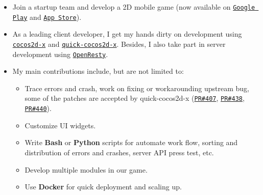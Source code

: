 \documentclass[letterpaper]{article}
\begin{document}
\begin{itemize}
\begin{itemize}
            \item Join a startup team and develop a 2D mobile game (now available on 
                \href{https://play.google.com/store/apps/details?id=com.game168.yysg}{\tt Google Play} and
                \href{https://itunes.apple.com/us/app/ye-ye-san-guo/id976517523?mt=8}{\tt App Store}).
            \item As a leading client developer, I get my hands dirty on development using \href{http://cocos2d-x.org/}{\tt cocos2d-x} and \href{https://github.com/dualface/v3quick}{\tt quick-cocos2d-x}. Besides, I also take part in server development using \href{https://github.com/openresty/openresty}{\tt OpenResty}.
            \item My main contributions include, but are not limited to:
                \begin{itemize}
                    \item Trace errors and crash, work on fixing or workarounding upstream bug, some of the patches are accepted by quick-cocos2d-x (\href{https://github.com/dualface/v3quick/pull/407}{\tt PR\#407}, \href{https://github.com/dualface/v3quick/pull/438}{\tt PR\#438}, \href{https://github.com/dualface/v3quick/pull/440}{\tt PR\#440}).
                    \item Customize UI widgets.
                    \item Write \textbf{Bash} or \textbf{Python} scripts for automate work flow, sorting and distribution of errors and crashes, server API press test, etc.
                    \item Develop multiple modules in our game.
                    \item Use \textbf{Docker} for quick deployment and scaling up.
                \end{itemize}
        \end{itemize}
\end{itemize}
\end{document}
